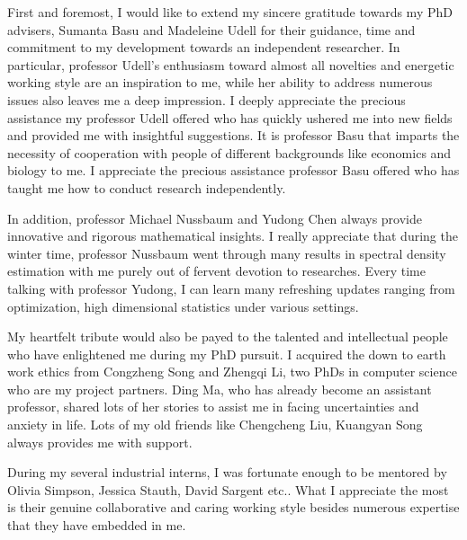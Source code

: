 \documentclass[phd,tocprelim]{cornell}
\numberwithin{equation}{section}
\begin{document}
\begin{acknowledgements}
	First and foremost, I would like to extend my sincere gratitude towards my PhD advisers, Sumanta Basu and Madeleine Udell for their guidance, time and commitment to my development towards an independent researcher. In particular, professor Udell's enthusiasm toward almost all novelties and energetic working style are an inspiration to me, while her ability to address numerous issues also leaves me a deep impression. I deeply appreciate the precious assistance my professor Udell offered who has quickly ushered me into new fields and provided me with insightful suggestions.
	 It is professor Basu that imparts the necessity of cooperation with people of different backgrounds like economics and biology to me.  I appreciate the precious assistance professor Basu offered who has taught me how to conduct research independently. \par 
	In addition, professor Michael Nussbaum and Yudong Chen always provide innovative and rigorous mathematical insights. I really appreciate that during the winter time, professor Nussbaum went through many results in spectral density estimation with me purely out of fervent devotion to researches. Every time talking with professor Yudong, I can learn many refreshing updates ranging from optimization, high dimensional statistics under various settings. \par 
	My heartfelt tribute would also be payed to the talented and intellectual people who have enlightened me during my PhD pursuit. I acquired the down to earth work ethics from Congzheng Song and Zhengqi Li, two PhDs in computer science who are my project partners. Ding Ma, who has already become an assistant professor, shared lots of her stories to assist me in facing uncertainties and anxiety in life. Lots of my old friends like Chengcheng Liu, Kuangyan Song always provides me with support. 
	
	During my several industrial interns, I was fortunate enough to be mentored by Olivia Simpson, Jessica Stauth, David Sargent etc.. What I appreciate the most is their genuine collaborative and caring working style besides numerous expertise that they have embedded in me. 
	
\end{acknowledgements}

\contentspage
\listoffigures
\listoftables

\normalspacing \setcounter{page}{1} 
\pagestyle{cornell} \addtolength{\parskip}{0.5\baselineskip}
\end{document}
